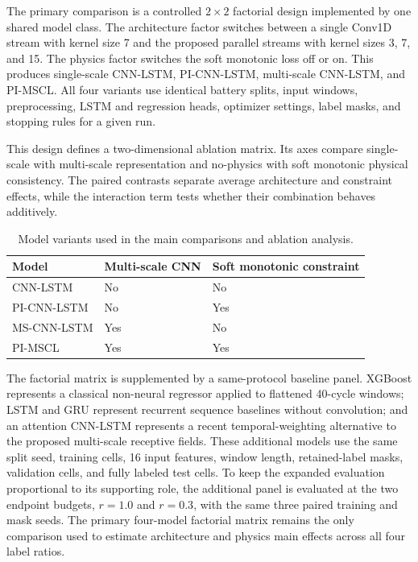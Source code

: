 \documentclass[pdflatex,sn-mathphys-num]{sn-jnl}
\begin{document}
The primary comparison is a controlled $2\times2$ factorial design implemented by one shared model class. The architecture factor switches between a single Conv1D stream with kernel size 7 and the proposed parallel streams with kernel sizes 3, 7, and 15. The physics factor switches the soft monotonic loss off or on. This produces single-scale CNN-LSTM, PI-CNN-LSTM, multi-scale CNN-LSTM, and PI-MSCL. All four variants use identical battery splits, input windows, preprocessing, LSTM and regression heads, optimizer settings, label masks, and stopping rules for a given run.

This design defines a two-dimensional ablation matrix. Its axes compare single-scale with multi-scale representation and no-physics with soft monotonic physical consistency. The paired contrasts separate average architecture and constraint effects, while the interaction term tests whether their combination behaves additively.

\begin{table}[t]
\caption{Model variants used in the main comparisons and ablation analysis.}
\label{tab:model_variants}
\centering
\begin{tabular}{lll}
\toprule
Model & Multi-scale CNN & Soft monotonic constraint \\
\midrule
CNN-LSTM & No & No \\
PI-CNN-LSTM & No & Yes \\
MS-CNN-LSTM & Yes & No \\
PI-MSCL & Yes & Yes \\
\bottomrule
\end{tabular}
\end{table}

The factorial matrix is supplemented by a same-protocol baseline panel. XGBoost represents a classical non-neural regressor applied to flattened 40-cycle windows; LSTM and GRU represent recurrent sequence baselines without convolution; and an attention CNN-LSTM represents a recent temporal-weighting alternative to the proposed multi-scale receptive fields. These additional models use the same split seed, training cells, 16 input features, window length, retained-label masks, validation cells, and fully labeled test cells. To keep the expanded evaluation proportional to its supporting role, the additional panel is evaluated at the two endpoint budgets, $r=1.0$ and $r=0.3$, with the same three paired training and mask seeds. The primary four-model factorial matrix remains the only comparison used to estimate architecture and physics main effects across all four label ratios.
\end{document}
